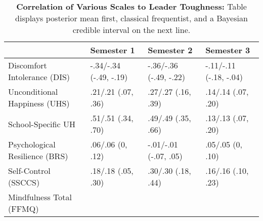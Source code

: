 \begin{table}[ht]
\centering
\begin{tabular}{llll}
  \hline
 & Semester 1 & Semester 2 & Semester 3 \\ 
  \hline
Discomfort Intolerance (DIS) & -.34/-.34 (-.49, -.19) & -.36/-.36 (-.49, -.22) & -.11/-.11 (-.18, -.04) \\ 
  Unconditional Happiness (UHS) & .21/.21 (.07, .36) & .27/.27 (.16, .39) & .14/.14 (.07, .20) \\ 
  School-Specific UH & .51/.51 (.34, .70) & .49/.49 (.35, .66) & .13/.13 (.07, .20) \\ 
  Psychological Resilience (BRS) & .06/.06 (0, .12) & -.01/-.01 (-.07, .05) & .05/.05 (0, .10) \\ 
  Self-Control (SSCCS) & .18/.18 (.05, .30) & .30/.30 (.18, .44) & .16/.16 (.10, .23) \\ 
  Mindfulness Total (FFMQ) &  &  &  \\ 
   \hline
\end{tabular}
\caption{\textbf{Correlation of Various Scales to Leader Toughness:} Table displays posterior mean first, classical frequentist, and a Bayesian credible interval on the next line.} 
\label{tab:edc_corr}
\end{table}
